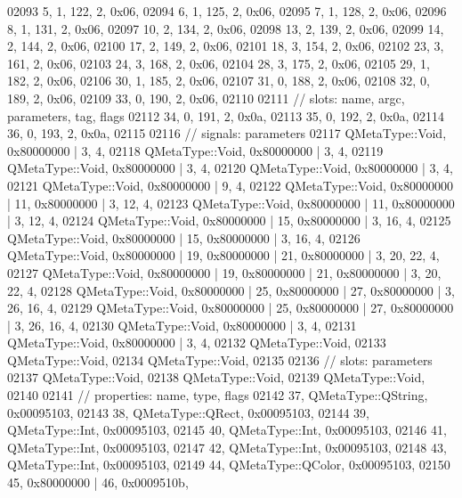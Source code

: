 \begin{DoxyCode}
02093        5,    1,  122,    2, 0x06,
02094        6,    1,  125,    2, 0x06,
02095        7,    1,  128,    2, 0x06,
02096        8,    1,  131,    2, 0x06,
02097       10,    2,  134,    2, 0x06,
02098       13,    2,  139,    2, 0x06,
02099       14,    2,  144,    2, 0x06,
02100       17,    2,  149,    2, 0x06,
02101       18,    3,  154,    2, 0x06,
02102       23,    3,  161,    2, 0x06,
02103       24,    3,  168,    2, 0x06,
02104       28,    3,  175,    2, 0x06,
02105       29,    1,  182,    2, 0x06,
02106       30,    1,  185,    2, 0x06,
02107       31,    0,  188,    2, 0x06,
02108       32,    0,  189,    2, 0x06,
02109       33,    0,  190,    2, 0x06,
02110 
02111  \textcolor{comment}{// slots: name, argc, parameters, tag, flags}
02112       34,    0,  191,    2, 0x0a,
02113       35,    0,  192,    2, 0x0a,
02114       36,    0,  193,    2, 0x0a,
02115 
02116  \textcolor{comment}{// signals: parameters}
02117     QMetaType::Void, 0x80000000 | 3,    4,
02118     QMetaType::Void, 0x80000000 | 3,    4,
02119     QMetaType::Void, 0x80000000 | 3,    4,
02120     QMetaType::Void, 0x80000000 | 3,    4,
02121     QMetaType::Void, 0x80000000 | 9,    4,
02122     QMetaType::Void, 0x80000000 | 11, 0x80000000 | 3,   12,    4,
02123     QMetaType::Void, 0x80000000 | 11, 0x80000000 | 3,   12,    4,
02124     QMetaType::Void, 0x80000000 | 15, 0x80000000 | 3,   16,    4,
02125     QMetaType::Void, 0x80000000 | 15, 0x80000000 | 3,   16,    4,
02126     QMetaType::Void, 0x80000000 | 19, 0x80000000 | 21, 0x80000000 | 3,   20,   22,    4,
02127     QMetaType::Void, 0x80000000 | 19, 0x80000000 | 21, 0x80000000 | 3,   20,   22,    4,
02128     QMetaType::Void, 0x80000000 | 25, 0x80000000 | 27, 0x80000000 | 3,   26,   16,    4,
02129     QMetaType::Void, 0x80000000 | 25, 0x80000000 | 27, 0x80000000 | 3,   26,   16,    4,
02130     QMetaType::Void, 0x80000000 | 3,    4,
02131     QMetaType::Void, 0x80000000 | 3,    4,
02132     QMetaType::Void,
02133     QMetaType::Void,
02134     QMetaType::Void,
02135 
02136  \textcolor{comment}{// slots: parameters}
02137     QMetaType::Void,
02138     QMetaType::Void,
02139     QMetaType::Void,
02140 
02141  \textcolor{comment}{// properties: name, type, flags}
02142       37, QMetaType::QString, 0x00095103,
02143       38, QMetaType::QRect, 0x00095103,
02144       39, QMetaType::Int, 0x00095103,
02145       40, QMetaType::Int, 0x00095103,
02146       41, QMetaType::Int, 0x00095103,
02147       42, QMetaType::Int, 0x00095103,
02148       43, QMetaType::Int, 0x00095103,
02149       44, QMetaType::QColor, 0x00095103,
02150       45, 0x80000000 | 46, 0x0009510b,

\end{DoxyCode}
